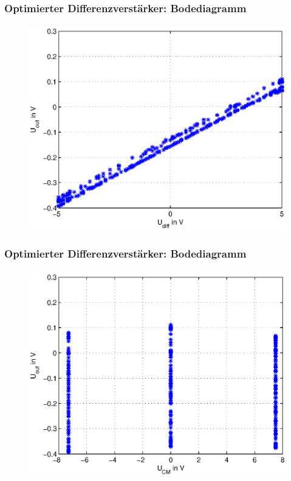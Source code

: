 \begin{frame}
    \frametitle{Optimierter Differenzverstärker: Bodediagramm}
    \framesubtitle{}
     \begin{figure}[H]
     \begin{center}
             \includegraphics[scale=0.5]{./img/bode/Aufgabe_3_4_Ud.eps}
     \end{center}
     \end{figure}
\end{frame}
\begin{frame}
    \frametitle{Optimierter Differenzverstärker: Bodediagramm}
    \framesubtitle{}
     \begin{figure}[H]
     \begin{center}
             \includegraphics[scale=0.5]{./img/bode/Aufgabe_3_4_U.eps}
     \end{center}
     \end{figure}
\end{frame}

